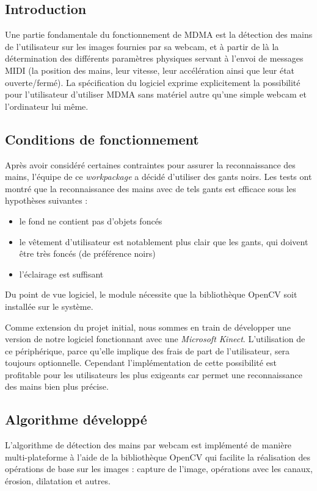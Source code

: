 \subsection*{Introduction}
\par Une partie fondamentale du fonctionnement de MDMA est la détection des mains de l'utilisateur sur les images fournies par sa webcam, et à partir de là la détermination des différents paramètres physiques servant à l'envoi de messages MIDI (la position des mains, leur vitesse, leur accélération ainsi que leur état ouverte/fermé). La spécification du logiciel exprime explicitement la possibilité pour l'utilisateur d'utiliser MDMA sans matériel autre qu'une simple webcam et l'ordinateur lui même.
\subsection*{Conditions de fonctionnement}
\par Après avoir considéré certaines contraintes pour assurer la reconnaissance des mains, l'équipe de ce \emph{workpackage} a décidé d'utiliser des gants noirs. Les tests ont montré que la reconnaissance des mains avec de tels gants est efficace sous les hypothèses suivantes :
\begin{itemize}
    \item le fond ne contient pas d'objets foncés
    \item le vêtement d'utilisateur est notablement plus clair que les gants, qui doivent être très foncés (de préférence noirs)
    \item l'éclairage est suffisant
\end{itemize}
\par Du point de vue logiciel, le module nécessite que la bibliothèque OpenCV soit installée sur le système.
\par Comme extension du projet initial, nous sommes en train de développer une version de notre logiciel fonctionnant avec une \emph{Microsoft Kinect}. L'utilisation de ce périphérique, parce qu'elle implique des frais de part de l'utilisateur, sera toujours optionnelle. Cependant l'implémentation de cette possibilité est profitable pour les utilisateurs les plus exigeants car permet une reconnaissance des mains bien plus précise.

\subsection*{Algorithme développé}
\par L'algorithme de détection des mains par webcam est implémenté de manière multi-plateforme à l'aide de la bibliothèque OpenCV qui facilite la réalisation des opérations de base sur les images : capture de l'image, opérations avec les canaux, érosion, dilatation et autres.
